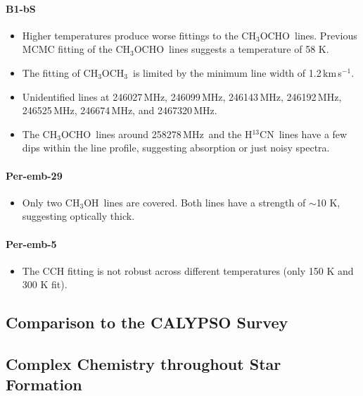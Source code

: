 \documentclass[twocolumn]{aastex62}
\newcommand{\kms}{\mbox{\,km\,s$^{-1}$}}
\newcommand{\mhz}{\mbox{\,MHz}}
\newcommand{\jj}[2]{\mbox{$J = #1\rightarrow#2$}}
\newcommand{\htcn}{\mbox{H$^{13}$CN}}
\newcommand{\methylformate}{\mbox{CH$_{3}$OCHO}}
\newcommand{\methanol}{\mbox{CH$_{3}$OH}}
\newcommand{\dimethylether}{\mbox{CH$_{3}$OCH$_{3}$}}
\newcommand{\sosigma}{\mbox{SO\,$^{3}\Sigma$}}
\begin{document}
\paragraph{B1-bS}
\begin{itemize}
  \item Higher temperatures produce worse fittings to the \methylformate\ lines.  Previous MCMC fitting of the \methylformate\ lines suggests a temperature of 58 K.
  \item The fitting of \dimethylether\ is limited by the minimum line width of 1.2\kms.  
  \item Unidentified lines at 246027\mhz, 246099\mhz, 246143\mhz, 246192\mhz, 246525\mhz, 246674\mhz, and 2467320\mhz.
  \item The \methylformate\ lines around 258278\mhz\ and the \htcn\ lines have a few dips within the line profile, suggesting absorption or just noisy spectra.
\end{itemize}

\paragraph{Per-emb-29}
\begin{itemize}
  \item Only two \methanol\ lines are covered.  Both lines have a strength of $\sim$10 K, suggesting optically thick.
\end{itemize}

\paragraph{Per-emb-5}
\begin{itemize}
  \item The CCH fitting is not robust across different temperatures (only 150 K and 300 K fit).
\end{itemize}


\subsection{Comparison to the CALYPSO Survey}
\subsection{Complex Chemistry throughout Star Formation}

\end{document}
